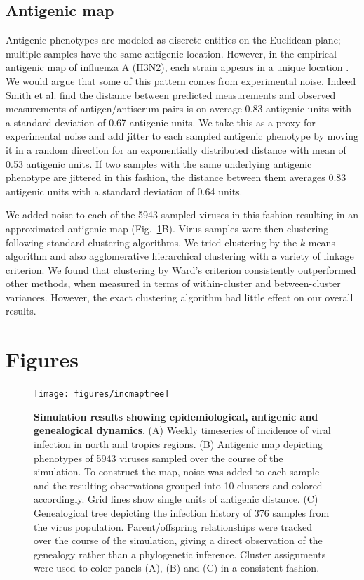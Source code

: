 \documentclass[11pt,oneside,letterpaper]{article}
\begin{document}
\subsection*{Antigenic map}

Antigenic phenotypes are modeled as discrete entities on the Euclidean plane; multiple samples have the same antigenic location.  However, in the empirical antigenic map of influenza A (H3N2), each strain appears in a unique location \cite{Smith04}.  We would argue that some of this pattern comes from experimental noise.  Indeed Smith et al. \cite{Smith04} find the distance between predicted measurements and observed measurements of antigen/antiserum pairs is on average 0.83 antigenic units with a standard deviation of 0.67 antigenic units.  We take this as a proxy for experimental noise and add jitter to each sampled antigenic phenotype by moving it in a random direction for an exponentially distributed distance with mean of 0.53 antigenic units.  If two samples with the same underlying antigenic phenotype are jittered in this fashion, the distance between them averages 0.83 antigenic units with a standard deviation of 0.64 units.

We added noise to each of the 5943 sampled viruses in this fashion resulting in an approximated antigenic map (Fig.~\ref{incmaptree}B).  Virus samples were then clustering following standard clustering algorithms.  We tried clustering by the $k$-means algorithm and also agglomerative hierarchical clustering with a variety of linkage criterion.  We found that clustering by Ward's criterion consistently outperformed other methods, when measured in terms of within-cluster and between-cluster variances.  However, the exact clustering algorithm had little effect on our overall results.



\pagebreak

\section*{Figures}

\begin{figure}[H]
	\centering
	\texttt{[image: figures/incmaptree]}
	\caption{\textbf{Simulation results showing epidemiological, antigenic and genealogical dynamics}. (A) Weekly timeseries of incidence of viral infection in north and tropics regions. (B) Antigenic map depicting phenotypes of 5943 viruses sampled over the course of the simulation.  To construct the map, noise was added to each sample and the resulting observations grouped into 10 clusters and colored accordingly.  Grid lines show single units of antigenic distance. (C) Genealogical tree depicting the infection history of 376 samples from the virus population.  Parent/offspring relationships were tracked over the course of the simulation, giving a direct observation of the genealogy rather than a phylogenetic inference. Cluster assignments were used to color panels (A), (B) and (C) in a consistent fashion.}
	\label{incmaptree}
\end{figure}
\end{document}
